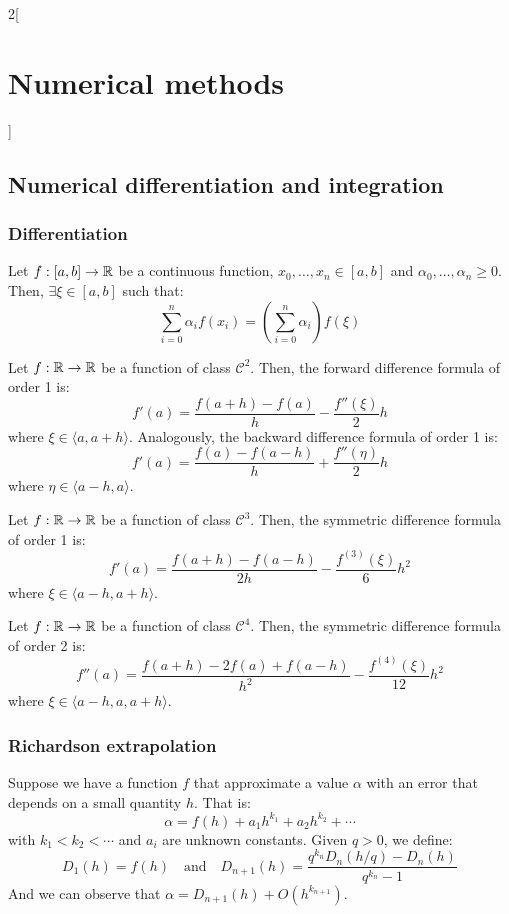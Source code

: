 \documentclass[../../../main.tex]{subfiles}
\begin{document}
\begin{multicols}{2}[\section{Numerical methods}]
\subsection{Numerical differentiation and integration}
\subsubsection*{Differentiation}
\begin{theorem}
    Let $f:[a,b]\rightarrow\mathbb{R}$ be a continuous function, $x_0,\ldots,x_n\in[a,b]$ and $\alpha_0,\ldots,\alpha_n\geq 0$. Then, $\exists\xi\in[a,b]$ such that: $$\sum_{i=0}^n\alpha_if(x_i)=\left(\sum_{i=0}^n\alpha_i\right)f(\xi)$$
\end{theorem}
\begin{theorem}
    Let $f:\mathbb{R}\rightarrow\mathbb{R}$ be a function of class $\mathcal{C}^2$. Then, the forward difference formula of order 1 is: $$f'(a)=\frac{f(a+h)-f(a)}{h}-\frac{f''(\xi)}{2}h$$ where $\xi\in\langle a,a+h\rangle$. Analogously, the backward difference formula of order 1 is: $$f'(a)=\frac{f(a)-f(a-h)}{h}+\frac{f''(\eta)}{2}h$$ where $\eta\in\langle a-h,a\rangle$.
\end{theorem}
\begin{theorem}
    Let $f:\mathbb{R}\rightarrow\mathbb{R}$ be a function of class $\mathcal{C}^3$. Then, the symmetric difference formula of order 1 is: $$f'(a)=\frac{f(a+h)-f(a-h)}{2h}-\frac{f^{(3)}(\xi)}{6}h^2$$ where $\xi\in\langle a-h,a+h\rangle$.
\end{theorem}
\begin{theorem}
    Let $f:\mathbb{R}\rightarrow\mathbb{R}$ be a function of class $\mathcal{C}^4$. Then, the symmetric difference formula of order 2 is: $$f''(a)=\frac{f(a+h)-2f(a)+f(a-h)}{h^2}-\frac{f^{(4)}(\xi)}{12}h^2$$ where $\xi\in\langle a-h,a,a+h\rangle$.
\end{theorem}
\subsubsection*{Richardson extrapolation}
\begin{theorem}
    Suppose we have a function $f$ that approximate a value $\alpha$ with an error that depends on a small quantity $h$. That is: $$\alpha=f(h)+a_1h^{k_1}+a_2h^{k_2}+\cdots$$ with $k_1<k_2<\cdots$ and $a_i$ are unknown constants. Given $q>0$, we define: $$D_1(h)=f(h)\quad\text{and}\quad D_{n+1}(h)=\frac{q^{k_n}D_n\left(h/q\right)-D_n(h)}{q^{k_n}-1}$$ And we can observe that $\alpha=D_{n+1}(h)+O(h^{k_{n+1}})$.
\end{theorem}

\end{multicols}
\end{document}
